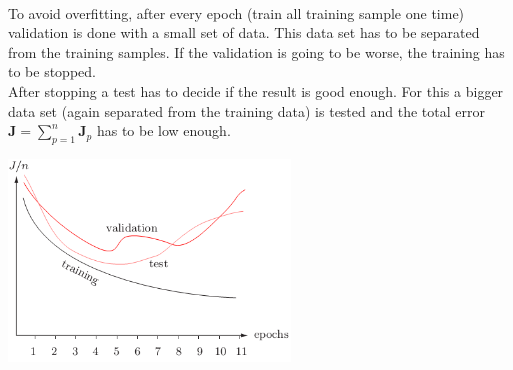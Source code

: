  \begin{minipage}{10cm}
 \\
 To avoid overfitting, after every epoch (train all training sample one time) validation is done with a small set of data.
 This data set has to be separated from the training samples.
 If the validation is going to be worse, the training has to be stopped.\\
 
 After stopping a test has to decide if the result is good enough. For this a bigger data set (again separated from the training data) is tested and 
 the total error $\bm J = \sum\limits_{p=1}^n \bm J_p$ has to be low enough.
 \end{minipage}
 \hspace{5mm}
 \begin{minipage}{8cm}
 \includegraphics[width=7.5cm]{./images/stopCriterion.png}
 \end{minipage}
 
